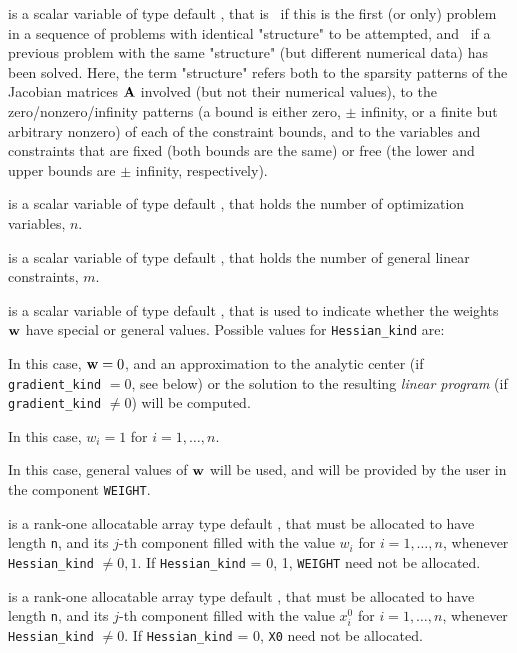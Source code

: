 \documentclass{galahad}
\begin{document}
\begin{description}

 is a scalar variable of type default \logical, 
 that is \true\ if this is the first (or only) problem in a sequence of 
 problems with identical "structure" to be attempted, and \false\ if 
 a previous problem with the same "structure" (but different
 numerical data) has been solved. Here, the term "structure" refers both to 
 the sparsity patterns of the Jacobian matrices ${\mathbf{A}}$ involved 
 (but not their numerical values), to the zero/nonzero/infinity patterns 
 (a bound is either zero, $\pm$ infinity, or a finite but arbitrary 
 nonzero) of each of the constraint bounds, and to the variables and constraints
 that are fixed (both bounds are the same) or free (the lower and upper
 bounds are $\pm$ infinity, respectively).

 is a scalar variable of type default \integer, 
 that holds the number of optimization variables, $n$.  
              
 is a scalar variable of type default \integer, 
 that holds the number of general linear constraints, $m$.
              
 is a scalar variable of type default \integer, 
that is used to indicate whether the weights ${\mathbf{w}}$ 
have special or general values. Possible values for {\tt Hessian\_kind} are:
\begin{description}
  In this case, ${\mathbf{w}} = 0$, and an approximation to the 
  analytic center (if {\tt gradient\_kind} $= 0$, see below) or the
  solution to the resulting {\em linear program}
  (if {\tt gradient\_kind} $\neq 0$) will be computed.

 In this case, $w_{i} = 1$ for $i = 1, \ldots ,n$.

 In this case, general values of ${\mathbf{w}}$ will be used,
     and will be provided by the user in the component {\tt WEIGHT}.
\end{description}

 is a rank-one allocatable array type default \realdp, that 
must be allocated to have length {\tt n}, and its $j$-th component 
filled with the value $w_{i}$ for $i = 1, \ldots ,n$, 
whenever {\tt Hessian\_kind} $\neq 0, 1$.
If {\tt Hessian\_kind} {= 0, 1}, {\tt WEIGHT} need not be allocated.

 is a rank-one allocatable array type default \realdp, that 
must be allocated to have length {\tt n}, and its $j$-th component 
filled with the value $x^0_{i}$ for $i = 1, \ldots ,n$, 
whenever {\tt Hessian\_kind} $\neq 0$.
If {\tt Hessian\_kind} {= 0}, {\tt X0} need not be allocated.


\end{description}
\end{document}
